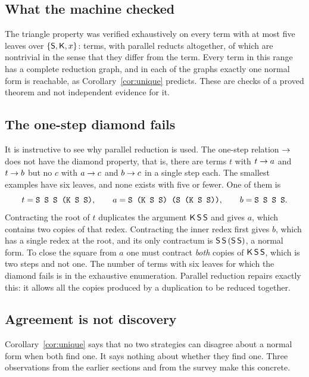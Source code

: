 \subsection{What the machine checked}

The triangle property was verified exhaustively on every term with at most five leaves over $\{\mathsf{S},\mathsf{K},x\}$: \factTriTerms{} terms, with \factTriPairs{} parallel reducts altogether, of which \factTriNontrivial{} are nontrivial in the sense that they differ from the term. Every term in this range has a complete reduction graph, and in each of the \factUniqueNF{} graphs exactly one normal form is reachable, as Corollary~\ref{cor:unique} predicts. These are checks of a proved theorem and not independent evidence for it.

\subsection{The one-step diamond fails}

It is instructive to see why parallel reduction is used. The one-step relation $\rightarrow$ does not have the diamond property, that is, there are terms $t$ with $t\rightarrow a$ and $t\rightarrow b$ but no $c$ with $a\rightarrow c$ and $b\rightarrow c$ in a single step each. The smallest examples have six leaves, and none exists with five or fewer. One of them is
\[
t=\texttt{S S S (K S S)},
\qquad
a=\texttt{S (K S S) (S (K S S))},
\qquad
b=\texttt{S S S S} .
\]
Contracting the root of $t$ duplicates the argument $\mathsf{K}\,\mathsf{S}\,\mathsf{S}$ and gives $a$, which contains two copies of that redex. Contracting the inner redex first gives $b$, which has a single redex at the root, and its only contractum is $\mathsf{S}\,\mathsf{S}\,(\mathsf{S}\,\mathsf{S})$, a normal form. To close the square from $a$ one must contract \emph{both} copies of $\mathsf{K}\,\mathsf{S}\,\mathsf{S}$, which is two steps and not one. The number of terms with six leaves for which the diamond fails is \factDiamondFailing{} in the exhaustive enumeration. Parallel reduction repairs exactly this: it allows all the copies produced by a duplication to be reduced together.

\subsection{Agreement is not discovery}

Corollary~\ref{cor:unique} says that no two strategies can disagree about a normal form when both find one. It says nothing about whether they find one. Three observations from the earlier sections and from the survey make this concrete.

